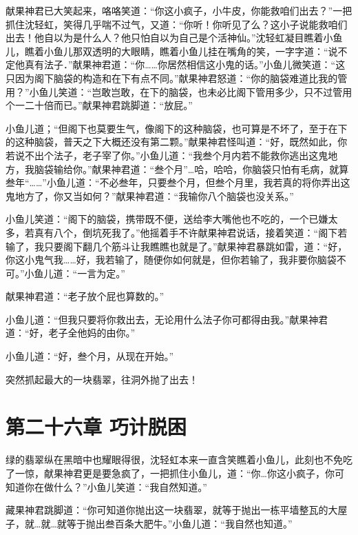\documentclass[12pt,oneside]{book}
\begin{document}
献果神君已大笑起来，咯咯笑道：``你这小疯子，小牛皮，你能救咱们出去？''一把抓住沈轻虹，笑得几乎喘不过气，又道：``你听！你听见了么？这小子说能救咱们出去！他自以为是什么人？他只怕自以为自己是个活神仙。''沈轻虹凝目瞧着小鱼儿，瞧着小鱼儿那双透明的大眼睛，瞧着小鱼儿挂在嘴角的笑，一字字道：``说不定他真有法子．''献果神君道：``你\ldots\ldots 你居然相信这小鬼的话。''小鱼儿微笑道：``这只因为阁下脑袋的构造和在下有点不同。''献果神君怒道：``你的脑袋难道比我的管用？''小鱼儿笑道：``岂敢岂敢，在下的脑袋，也未必比阁下管用多少，只不过管用个一二十倍而已。''献果神君跳脚道：``放屁。''

小鱼儿道；``但阁下也莫要生气，像阁下的这种脑袋，也可算是不坏了，至于在下的这种脑袋，普天之下大概还没有第二颗。''献果神君怪叫道：``好，既然如此，你若说不出个法子，老子宰了你。''小鱼儿道：``我叁个月内若不能救你逃出这鬼地方，我脑袋输给你。''献果神君道：``叁个月''\ldots 哈，哈哈，你脑袋只怕有毛病，就算叁年``\ldots\ldots{}''小鱼儿道：``不必叁年，只要叁个月，但叁个月里，我若真的将你弄出这鬼地方了，你又当如何？''献果神君道：``我输你八个脑袋也没关系。''

小鱼儿笑道：``阁下的脑袋，携带既不便，送给李大嘴他也不吃的，一个已嫌太多，若真有八个，倒坑死我了。''他摇着手不许献果神君说话，接着笑道：``阁下若输了，我只要阁下翻几个筋斗让我瞧瞧也就是了。''献果神君暴跳如雷，道：``好，你这小鬼气我\ldots\ldots 好，我若输了，随便你如何就是，但你若输了，我非要你脑袋不可。''小鱼儿道：``一言为定。''

献果神君道：``老子放个屁也算数的。''

小鱼儿道：``但我只要将你救出去，无论用什么法子你可都得由我。''献果神君道：``好，老子全他妈的由你。''

小鱼儿道：``好，叁个月，从现在开始。''

突然抓起最大的一块翡翠，往洞外抛了出去！

\hypertarget{ux7b2cux4e8cux5341ux516dux7ae0-ux5de7ux8ba1ux8131ux56f0}{%
\chapter{第二十六章
巧计脱困}\label{ux7b2cux4e8cux5341ux516dux7ae0-ux5de7ux8ba1ux8131ux56f0}}

绿的翡翠纵在黑暗中也耀眼得很，沈轻虹本来一直含笑瞧着小鱼儿，此刻也不免吃了一惊，献果神君更是要急疯了，一把抓住小鱼儿，道：``你\ldots 你这小疯子，你可知道你在做什么？''小鱼儿笑道：``我自然知道。''

藏果神君跳脚道：``你可知道你抛出这一块翡翠，就等于抛出一栋平墙整瓦的大屋子，就\ldots 就\ldots 就等于抛出叁百条大肥牛。''小鱼儿道：``我自然也知道。''
\end{document}
